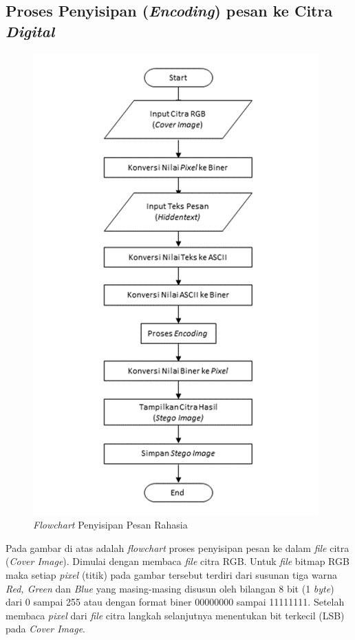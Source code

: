 	\subsection{Proses Penyisipan (\emph{Encoding}) pesan ke Citra \emph{Digital}}
	
	\begin{figure}[H]
		\centering
		\includegraphics[height=0.8\textheight]{gambar/penyisipan3}
		\caption{\emph{Flowchart} Penyisipan Pesan Rahasia}
		\label{flowchart_penyisipan}
	\end{figure}

	Pada gambar di atas adalah \emph{flowchart} proses penyisipan pesan ke dalam \emph{file}
	citra (\emph{Cover Image}). Dimulai dengan membaca \emph{file} citra RGB. Untuk \emph{file} bitmap RGB maka setiap \emph{pixel} (titik) pada gambar tersebut terdiri dari susunan
	tiga warna \emph{Red, Green} dan \emph{Blue} yang masing-masing disusun oleh bilangan 8 bit
	(1 \emph{byte}) dari 0 sampai 255 atau dengan format biner 00000000 sampai 11111111. Setelah
	membaca \emph{pixel} dari \emph{file} citra langkah selanjutnya menentukan bit terkecil (LSB) pada \emph{Cover Image}.
	

